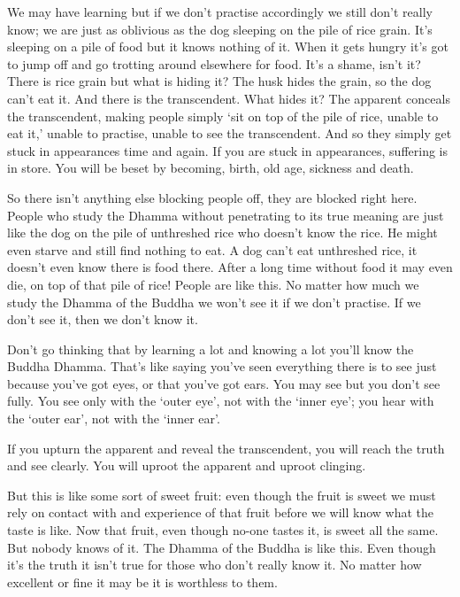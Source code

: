We may have learning but if we don't practise accordingly we still don't really know; we are just as oblivious as the dog sleeping on the pile of rice grain. It's sleeping on a pile of food but it knows nothing of it. When it gets hungry it's got to jump off and go trotting around elsewhere for food. It's a shame, isn't it? There is rice grain but what is hiding it? The husk hides the grain, so the dog can't eat it. And there is the transcendent. What hides it? The apparent conceals the transcendent, making people simply `sit on top of the pile of rice, unable to eat it,' unable to practise, unable to see the transcendent. And so they simply get stuck in appearances time and again. If you are stuck in appearances, suffering is in store. You will be beset by becoming, birth, old age, sickness and death. 

So there isn't anything else blocking people off, they are blocked right here. People who study the Dhamma without penetrating to its true meaning are just like the dog on the pile of unthreshed rice who doesn't know the rice. He might even starve and still find nothing to eat. A dog can't eat unthreshed rice, it doesn't even know there is food there. After a long time without food it may even die, on top of that pile of rice! People are like this. No matter how much we study the Dhamma of the Buddha we won't see it if we don't practise. If we don't see it, then we don't know it. 

Don't go thinking that by learning a lot and knowing a lot you'll know the Buddha Dhamma. That's like saying you've seen everything there is to see just because you've got eyes, or that you've got ears. You may see but you don't see fully. You see only with the `outer eye', not with the `inner eye'; you hear with the `outer ear', not with the `inner ear'. 

If you upturn the apparent and reveal the transcendent, you will reach the truth and see clearly. You will uproot the apparent and uproot clinging. 

But this is like some sort of sweet fruit: even though the fruit is sweet we must rely on contact with and experience of that fruit before we will know what the taste is like. Now that fruit, even though no-one tastes it, is sweet all the same. But nobody knows of it. The Dhamma of the Buddha is like this. Even though it's the truth it isn't true for those who don't really know it. No matter how excellent or fine it may be it is worthless to them. 

